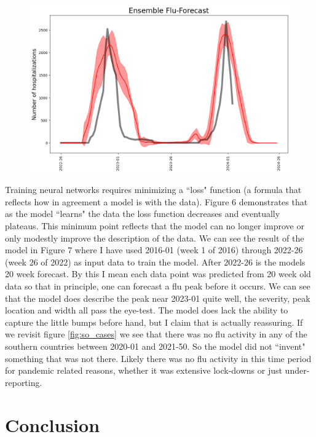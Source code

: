 \documentclass[12pt,a4paper,english]{article}
\begin{document}
\begin{figure}[h!]
		\begin{center}
		\includegraphics[scale=0.6]{Pictures/forecast_shade.png}
		\caption{}
		\end{center}
		\label{fig:f_shade}
	\end{figure}
\FloatBarrier


Training neural networks requires minimizing a ``loss" function (a formula that reflects how in agreement a model is with the data). Figure 6 demonstrates that as the model ``learns" the data the loss function decreases and eventually plateaus. This minimum point reflects that the model can no longer improve or only modestly improve the description of the data. We can see the result of the model in Figure 7 where I have used 2016-01 (week 1 of 2016) through 2022-26 (week 26 of 2022) as input data to train the model. After 2022-26 is the models 20 week forecast. By this I mean each data point was predicted from 20 week old data so that in principle, one can forecast a flu peak before it occurs. We can see that the model does describe the peak near 2023-01 quite well, the severity, peak location and width all pass the eye-test. The model does lack the ability to capture the little bumps before hand, but I claim that is actually reassuring. If we revisit figure \ref{fig:so_cases} we see that there was no flu activity in any of the southern countries between 2020-01 and 2021-50. So the model did not ``invent" something that was not there. Likely there was no flu activity in this time period for pandemic related reasons, whether it was extensive lock-downs or just under-reporting.

\section{Conclusion}
\end{document}
